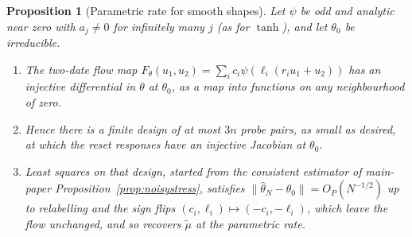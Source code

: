 \documentclass[12pt]{article}
\newtheorem{proposition}[theorem]{Proposition}
\theoremstyle{definition}
\theoremstyle{remark}
\begin{document}
\begin{proposition}[Parametric rate for smooth shapes]\label{prop:stressrate}
Let $\psi$ be odd and analytic near zero with $a_j\ne0$ for infinitely many $j$ (as for $\tanh$), and let $\theta_0$ be irreducible.
\begin{enumerate}[label=(\roman*),itemsep=1pt]
\item The two-date flow map $F_\theta(u_1,u_2)=\sum_ic_i\psi(\ell_i(r_iu_1+u_2))$ has an injective differential in $\theta$ at $\theta_0$, as a map into functions on any neighbourhood of zero.
\item Hence there is a finite design of at most $3n$ probe pairs, as small as desired, at which the reset responses have an injective Jacobian at $\theta_0$.
\item Least squares on that design, started from the consistent estimator of main-paper Proposition~\ref{prop:noisystress}, satisfies $\|\hat\theta_N-\theta_0\|=O_P(N^{-1/2})$ up to relabelling and the sign flips $(c_i,\ell_i)\mapsto(-c_i,-\ell_i)$, which leave the flow unchanged, and so recovers $\tilde\mu$ at the parametric rate.
\end{enumerate}
\end{proposition}
\end{document}
